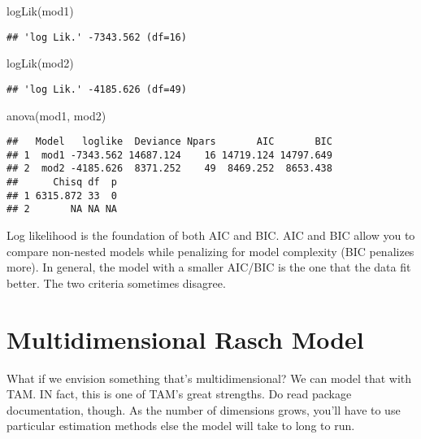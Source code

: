 \documentclass[
]{book}
\newenvironment{Shaded}{\begin{snugshade}}{\end{snugshade}}
\newcommand{\FunctionTok}[1]{\textcolor[rgb]{0.00,0.00,0.00}{#1}}
\newcommand{\NormalTok}[1]{#1}
\begin{document}
\begin{Shaded}
\begin{Highlighting}[]
\FunctionTok{logLik}\NormalTok{(mod1)}
\end{Highlighting}
\end{Shaded}

\begin{verbatim}
## 'log Lik.' -7343.562 (df=16)
\end{verbatim}

\begin{Shaded}
\begin{Highlighting}[]
\FunctionTok{logLik}\NormalTok{(mod2)}
\end{Highlighting}
\end{Shaded}

\begin{verbatim}
## 'log Lik.' -4185.626 (df=49)
\end{verbatim}

\begin{Shaded}
\begin{Highlighting}[]
\FunctionTok{anova}\NormalTok{(mod1, mod2)}
\end{Highlighting}
\end{Shaded}

\begin{verbatim}
##   Model   loglike  Deviance Npars       AIC       BIC
## 1  mod1 -7343.562 14687.124    16 14719.124 14797.649
## 2  mod2 -4185.626  8371.252    49  8469.252  8653.438
##      Chisq df  p
## 1 6315.872 33  0
## 2       NA NA NA
\end{verbatim}

Log likelihood is the foundation of both AIC and BIC. AIC and BIC allow you to compare non-nested models while penalizing for model complexity (BIC penalizes more). In general, the model with a smaller AIC/BIC is the one that the data fit better. The two criteria sometimes disagree.

\hypertarget{multidimensional}{%
\chapter{Multidimensional Rasch Model}\label{multidimensional}}

What if we envision something that's multidimensional? We can model that with TAM. IN fact, this is one of TAM's great strengths. Do read package documentation, though. As the number of dimensions grows, you'll have to use particular estimation methods else the model will take to long to run.
\end{document}
